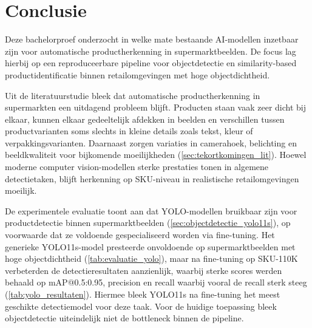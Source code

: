 
\chapter{Conclusie}%
\label{ch:conclusie}


Deze bachelorproef onderzocht in welke mate bestaande AI-modellen inzetbaar zijn voor automatische productherkenning in supermarktbeelden. De focus lag hierbij op een reproduceerbare pipeline voor objectdetectie en similarity-based productidentificatie binnen retailomgevingen met hoge objectdichtheid.

Uit de literatuurstudie bleek dat automatische productherkenning in supermarkten een uitdagend probleem blijft. Producten staan vaak zeer dicht bij elkaar, kunnen elkaar gedeeltelijk afdekken in beelden en verschillen tussen productvarianten soms slechts in kleine details zoals tekst, kleur of verpakkingsvarianten. Daarnaast zorgen variaties in camerahoek, belichting en beeldkwaliteit voor bijkomende moeilijkheden (\ref{sec:tekortkomingen_lit}). Hoewel moderne computer vision-modellen sterke prestaties tonen in algemene detectietaken, blijft herkenning op SKU-niveau in realistische retailomgevingen moeilijk.

De experimentele evaluatie toont aan dat YOLO-modellen bruikbaar zijn voor productdetectie binnen supermarktbeelden (\ref{sec:objectdetectie_yolo11s}), op voorwaarde dat ze voldoende gespecialiseerd worden via fine-tuning. Het generieke YOLO11s-model presteerde onvoldoende op supermarktbeelden met hoge objectdichtheid (\ref{tab:evaluatie_yolo}), maar na fine-tuning op SKU-110K verbeterden de detectieresultaten aanzienlijk, waarbij sterke scores werden behaald op mAP@0.5:0.95, precision en recall waarbij vooral de recall sterk steeg (\ref{tab:yolo_resultaten}). Hiermee bleek YOLO11s na fine-tuning het meest geschikte detectiemodel voor deze taak. Voor de huidige toepassing bleek objectdetectie uiteindelijk niet de bottleneck binnen de pipeline.


